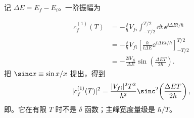 \begin{derivation}[有限时间跃迁概率与黄金法则]
记 $\Delta E=E_f-E_i$。一阶振幅为

\begin{align*}
 c_f^{(1)}(T)
 &=-\frac{\ii}{\hbar}V_{fi}
 \int_{-T/2}^{T/2}\dd t\,\ee^{\ii\Delta E t/\hbar}\\
 &=-\frac{\ii}{\hbar}V_{fi}
 \left[\frac{\hbar}{\ii\Delta E}
 \ee^{\ii\Delta E t/\hbar}\right]_{-T/2}^{T/2}\\
 &=-\frac{2\ii V_{fi}}{\Delta E}
 \sin\!\left(\frac{\Delta E T}{2\hbar}\right).
\end{align*}
把 $\sinc x\equiv\sin x/x$ 提出，得到
\begin{equation*}
 |c_f^{(1)}(T)|^2
 =\frac{|V_{fi}|^2T^2}{\hbar^2}
 \sinc^2\!\left(\frac{\Delta E T}{2\hbar}\right),
\end{equation*}
即。它在有限 $T$ 时不是 $\delta$ 函数；主峰宽度量级是 $\hbar/T$。


\end{derivation}
